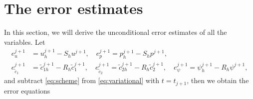 \section{The error estimates}\label{sec:error}

In this section, we will derive the unconditional error estimates of all the variables. Let
\begin{equation}\label{eq:error-def}
\begin{aligned}
  e_{u}^{j+1}       &= u_{h}^{j+1} - S_{h}u^{j+1}, \quad
  e_{p}^{j+1}        = p_{h}^{j+1} - S_{h}p^{j+1}, \\
  e_{\tilde{c}_{1}}^{j+1} &= \tilde{c}_{1h}^{j+1} - R_{h}\tilde{c}_{1}^{j+1}, \quad
  e_{\tilde{c}_{2}}^{j+1}  = \tilde{c}_{2h}^{j+1} - R_{h}\tilde{c}_{2}^{j+1}, \quad
  e_{\psi}^{j+1}     = \psi_{h}^{j+1} - R_{h}\psi^{j+1},
\end{aligned}
\end{equation}
and subtract \eqref{eq:scheme} from \eqref{eq:variational} with $t = t_{j+1}$, then we obtain the error equations
